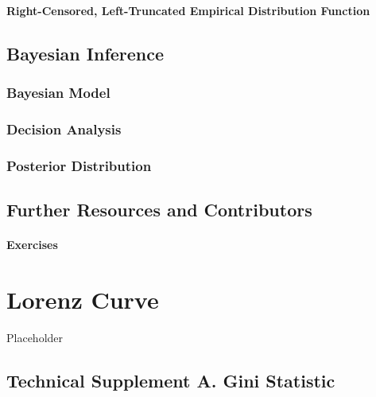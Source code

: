 \documentclass[]{book}
\theoremstyle{definition}
\theoremstyle{definition}
\theoremstyle{definition}
\theoremstyle{remark}
\begin{document}
\subsubsection{Right-Censored, Left-Truncated Empirical Distribution
Function}\label{right-censored-left-truncated-empirical-distribution-function}

\section{Bayesian Inference}\label{S:MS:BayesInference}

\subsection{Bayesian Model}\label{bayesian-model}

\subsection{Decision Analysis}\label{decision-analysis}

\subsection{Posterior Distribution}\label{posterior-distribution}

\section{Further Resources and
Contributors}\label{MS:further-reading-and-resources}

\subsubsection*{Exercises}\label{exercises}

\chapter{Lorenz Curve}\label{lorenz-curve}

Placeholder

\section*{Technical Supplement A. Gini
Statistic}\label{technical-supplement-a.-gini-statistic}
\end{document}
